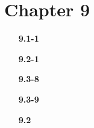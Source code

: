 \documentclass{article}
\begin{document}
\section*{Chapter 9}

\begin{enumerate}

\item[\textbf{9.1-1}]

\item[\textbf{9.2-1}]

\item[\textbf{9.3-8}]

\item[\textbf{9.3-9}]

\item[\textbf{9.2}]

\end{enumerate}
\end{document}
